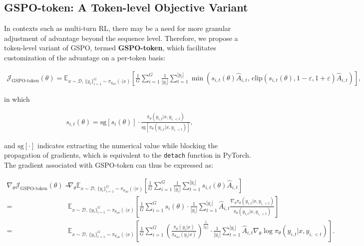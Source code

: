 \subsection{GSPO-token: A Token-level Objective Variant}

In contexts such as multi-turn RL, there may be a need for more granular adjustment of advantage beyond the sequence level. Therefore, we propose a token-level variant of GSPO, termed \textbf{GSPO-token}, which facilitates customization of the advantage on a per-token basis:

\begin{align}
\mathcal{J}_\text{GSPO-token}(\theta)
=
\mathbb{E}_{ x \sim \mathcal{D},\, \{y_i\}_{i=1}^G \sim \pi_{\theta_\text{old}}( \cdot | x) }
\left[ 
\frac{1}{G} \sum_{i=1}^{G} \frac{1}{|y_i|} \sum_{t=1}^{|y_i|} 
\min \left( s_{i,t}(\theta) \widehat{A}_{i,t},  \, \mathrm{clip} \left( s_{i,t}(\theta), 1 - {\varepsilon}, 1 + {\varepsilon} \right) \widehat{A}_{i,t} \right) 
\right],
\label{equ:gspo-token}
\end{align}

in which

\begin{align}
s_{i,t}(\theta) 
= \mathrm{sg} \left[ s_{i}(\theta) \right]  \cdot \frac{ \pi_{\theta} (y_{i,t} | x, y_{i,<t}) }{ \mathrm{sg} \left[ \pi_{\theta} (y_{i,t} | x, y_{i,<t}) \right] },
\end{align}

and $\mathrm{sg}[\cdot]$ indicates extracting the numerical value while blocking the propagation of gradients, which is equivalent to the \texttt{detach} function in PyTorch. The gradient associated with GSPO-token can thus be expressed as:

\begin{align}
\nabla_{\theta} \mathcal{J}_\text{GSPO-token}(\theta)
=&\ 
\nabla_{\theta} \mathbb{E}_{ x \sim \mathcal{D},\, \{y_i\}_{i=1}^G \sim \pi_{\theta_\text{old}}( \cdot | x) }
\left[ 
\frac{1}{G} \sum_{i=1}^{G}
\frac{1}{|y_i|} \sum_{t=1}^{|y_i|} 
s_{i,t}(\theta) \widehat{A}_{i,t}
\right] \\
=&\ 
\mathbb{E}_{ x \sim \mathcal{D},\, \{y_i\}_{i=1}^G \sim \pi_{\theta_\text{old}}( \cdot | x) }
\left[ 
\frac{1}{G} \sum_{i=1}^{G} s_i (\theta) \cdot \frac{1}{|y_i|} \sum_{t=1}^{|y_i|} 
\widehat{A}_{i,t} \frac{ \nabla_{\theta} \pi_{\theta} (y_{i,t} | x, y_{i,<t}) }{ \pi_{\theta} (y_{i,t} | x, y_{i,<t}) }
\right] \\
=&\ 
\mathbb{E}_{ x \sim \mathcal{D},\, \{y_i\}_{i=1}^G \sim \pi_{\theta_\text{old}}( \cdot | x) }
\left[ 
\frac{1}{G} \sum_{i=1}^{G}  \left( \frac{ \pi_{\theta} (y_i | x) }{ \pi_{\theta_\text{old}} (y_i | x)} \right)^{\frac{1}{|y_i|}}
\cdot \frac{1}{|y_i|} \sum_{t=1}^{|y_i|}
\widehat{A}_{i,t} \nabla_{\theta} \log \pi_{\theta} (y_{i,t} | x, y_{i,<t})  
\right].
\label{equ:gspo-token_grad}
\end{align}

